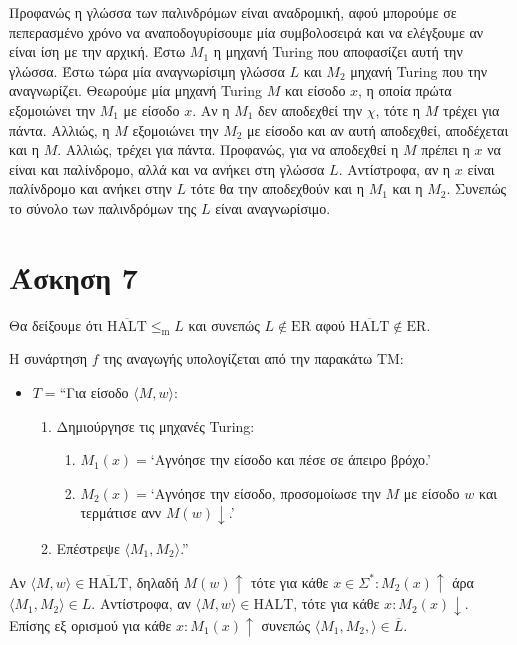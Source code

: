 \documentclass[a4paper, oneside, 11pt]{article}
\newcommand{\red}{\leq_{\text{m}}}
\theoremstyle{definition}
\begin{document}
Προφανώς η γλώσσα των παλινδρόμων είναι αναδρομική, αφού μπορούμε σε πεπερασμένο χρόνο να αναποδογυρίσουμε
μία συμβολοσειρά και να ελέγξουμε αν είναι ίση με την αρχική. Έστω $M_1$ η μηχανή Turing που αποφασίζει
αυτή την γλώσσα.
Έστω τώρα μία αναγνωρίσιμη γλώσσα $L$ και $M_2$ μηχανή Turing που την αναγνωρίζει. 
Θεωρούμε μία μηχανή Turing $Μ$ και είσοδο $x$, η οποία πρώτα εξομοιώνει την $M_1$ με είσοδο $x$. 
Αν η $M_1$ δεν αποδεχθεί
την $χ$, τότε η $M$ τρέχει για πάντα. Αλλιώς, η $M$ εξομοιώνει την $M_2$ με είσοδο και αν αυτή αποδεχθεί,
αποδέχεται και η $M$. Αλλιώς, τρέχει για πάντα. Προφανώς, για να αποδεχθεί η $M$ πρέπει η $x$ να είναι
και παλίνδρομο, αλλά και να ανήκει στη γλώσσα $L$. Αντίστροφα, αν η $x$ είναι παλίνδρομο και ανήκει στην $L$
τότε θα την αποδεχθούν και η $M_1$ και η $M_2$. Συνεπώς το σύνολο των παλινδρόμων της $L$ είναι αναγνωρίσιμο.

\section*{Άσκηση 7}

Θα δείξουμε ότι $\overline{\text{HALT}} \red L$ και συνεπώς $L \notin \text{ER}$ αφού
$\overline{\text{HALT}} \notin \text{ER}$.

Η συνάρτηση $f$ της αναγωγής υπολογίζεται από την παρακάτω TM:

\begin{itemize}
\item $T = $``Για είσοδο $\langle M, w \rangle$:
      \begin{enumerate}
      \item Δημιούργησε τις μηχανές Turing:
            \begin{enumerate}
               \item $M_1(x) = $`Αγνόησε την είσοδο και πέσε σε άπειρο βρόχο.'
               \item $M_2(x) = $`Αγνόησε την είσοδο, προσομοίωσε την $M$ με είσοδο $w$ και
               τερμάτισε ανν $M(w) \downarrow$.'
            \end{enumerate}
      \item Επέστρεψε $\langle M_1, M_2 \rangle$.''
      \end{enumerate}
\end{itemize}

Αν $\langle M, w \rangle \in \overline{\text{HALT}}$, δηλαδή $M(w) \uparrow$ τότε
για κάθε $x \in \Sigma^*: M_2(x) \uparrow$ άρα $\langle M_1, M_2 \rangle \in L$.
Αντίστροφα, αν $\langle M, w \rangle \in \text{HALT}$, τότε για κάθε $x: M_2(x)
\downarrow$. Επίσης εξ ορισμού για κάθε $x: M_1(x) \uparrow$ συνεπώς $\langle
M_1, M_2, \rangle \in \overline{L}$.
\end{document}
